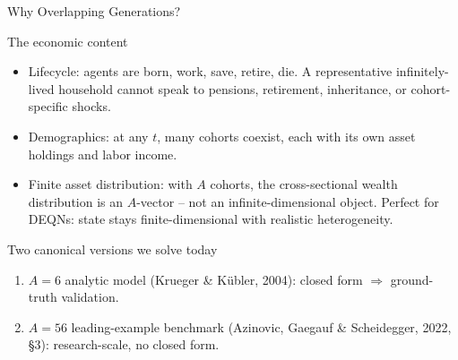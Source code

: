 \documentclass[aspectratio=169,11pt]{beamer}
\newcommand{\emphc}[1]{\textcolor{harvardcrimson}{#1}}
\begin{document}
\begin{frame}{Why Overlapping Generations?}
\footnotesize
\begin{block}{The economic content}
\vspace{-3pt}\begin{itemize}\itemsep2pt
    \item \emphc{Lifecycle:} agents are born, work, save, retire, die.  A representative infinitely-lived household cannot speak to pensions, retirement, inheritance, or cohort-specific shocks.
    \item \emphc{Demographics:} at any $t$, many cohorts coexist, each with its own asset holdings and labor income.
    \item \emphc{Finite asset distribution:} with $A$ cohorts, the cross-sectional wealth distribution is an $A$-vector -- not an infinite-dimensional object.  \emphc{Perfect for DEQNs:} state stays finite-dimensional with realistic heterogeneity.
\end{itemize}
\end{block}
\vspace{-3pt}
\begin{block}{Two canonical versions we solve today}
\vspace{-3pt}\begin{enumerate}\itemsep1pt
    \item $A=6$ analytic model (Krueger \& K\"ubler, 2004): closed form $\Rightarrow$ ground-truth validation.
    \item $A=56$ leading-example benchmark (Azinovic, Gaegauf \& Scheidegger, 2022, \S 3): research-scale, no closed form.
\end{enumerate}
\end{block}
\end{frame}
\end{document}
